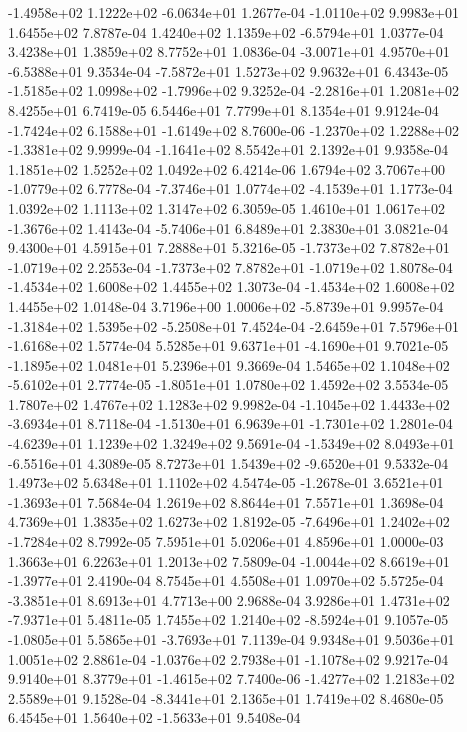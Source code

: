 -1.4958e+02  1.1222e+02 -6.0634e+01  1.2677e-04
-1.0110e+02  9.9983e+01  1.6455e+02  7.8787e-04
 1.4240e+02  1.1359e+02 -6.5794e+01  1.0377e-04
3.4238e+01 1.3859e+02 8.7752e+01  1.0836e-04
-3.0071e+01  4.9570e+01 -6.5388e+01  9.3534e-04
-7.5872e+01  1.5273e+02  9.9632e+01  6.4343e-05
-1.5185e+02  1.0998e+02 -1.7996e+02  9.3252e-04
-2.2816e+01  1.2081e+02  8.4255e+01  6.7419e-05
6.5446e+01 7.7799e+01 8.1354e+01  9.9124e-04
-1.7424e+02  6.1588e+01 -1.6149e+02  8.7600e-06
-1.2370e+02  1.2288e+02 -1.3381e+02  9.9999e-04
-1.1641e+02  8.5542e+01  2.1392e+01  9.9358e-04
1.1851e+02 1.5252e+02 1.0492e+02  6.4214e-06
 1.6794e+02  3.7067e+00 -1.0779e+02  6.7778e-04
-7.3746e+01  1.0774e+02 -4.1539e+01  1.1773e-04
1.0392e+02 1.1113e+02 1.3147e+02  6.3059e-05
 1.4610e+01  1.0617e+02 -1.3676e+02  1.4143e-04
-5.7406e+01  6.8489e+01  2.3830e+01  3.0821e-04
9.4300e+01 4.5915e+01 7.2888e+01  5.3216e-05
-1.7373e+02  7.8782e+01 -1.0719e+02  2.2553e-04
-1.7373e+02  7.8782e+01 -1.0719e+02  1.8078e-04
-1.4534e+02  1.6008e+02  1.4455e+02  1.3073e-04
-1.4534e+02  1.6008e+02  1.4455e+02  1.0148e-04
 3.7196e+00  1.0006e+02 -5.8739e+01  9.9957e-04
-1.3184e+02  1.5395e+02 -5.2508e+01  7.4524e-04
-2.6459e+01  7.5796e+01 -1.6168e+02  1.5774e-04
 5.5285e+01  9.6371e+01 -4.1690e+01  9.7021e-05
-1.1895e+02  1.0481e+01  5.2396e+01  9.3669e-04
 1.5465e+02  1.1048e+02 -5.6102e+01  2.7774e-05
-1.8051e+01  1.0780e+02  1.4592e+02  3.5534e-05
1.7807e+02 1.4767e+02 1.1283e+02  9.9982e-04
-1.1045e+02  1.4433e+02 -3.6934e+01  8.7118e-04
-1.5130e+01  6.9639e+01 -1.7301e+02  1.2801e-04
-4.6239e+01  1.1239e+02  1.3249e+02  9.5691e-04
-1.5349e+02  8.0493e+01 -6.5516e+01  4.3089e-05
 8.7273e+01  1.5439e+02 -9.6520e+01  9.5332e-04
1.4973e+02 5.6348e+01 1.1102e+02  4.5474e-05
-1.2678e-01  3.6521e+01 -1.3693e+01  7.5684e-04
1.2619e+02 8.8644e+01 7.5571e+01  1.3698e-04
4.7369e+01 1.3835e+02 1.6273e+02  1.8192e-05
-7.6496e+01  1.2402e+02 -1.7284e+02  8.7992e-05
7.5951e+01 5.0206e+01 4.8596e+01  1.0000e-03
1.3663e+01 6.2263e+01 1.2013e+02  7.5809e-04
-1.0044e+02  8.6619e+01 -1.3977e+01  2.4190e-04
8.7545e+01 4.5508e+01 1.0970e+02  5.5725e-04
-3.3851e+01  8.6913e+01  4.7713e+00  2.9688e-04
 3.9286e+01  1.4731e+02 -7.9371e+01  5.4811e-05
 1.7455e+02  1.2140e+02 -8.5924e+01  9.1057e-05
-1.0805e+01  5.5865e+01 -3.7693e+01  7.1139e-04
9.9348e+01 9.5036e+01 1.0051e+02  2.8861e-04
-1.0376e+02  2.7938e+01 -1.1078e+02  9.9217e-04
 9.9140e+01  8.3779e+01 -1.4615e+02  7.7400e-06
-1.4277e+02  1.2183e+02  2.5589e+01  9.1528e-04
-8.3441e+01  2.1365e+01  1.7419e+02  8.4680e-05
 6.4545e+01  1.5640e+02 -1.5633e+01  9.5408e-04
